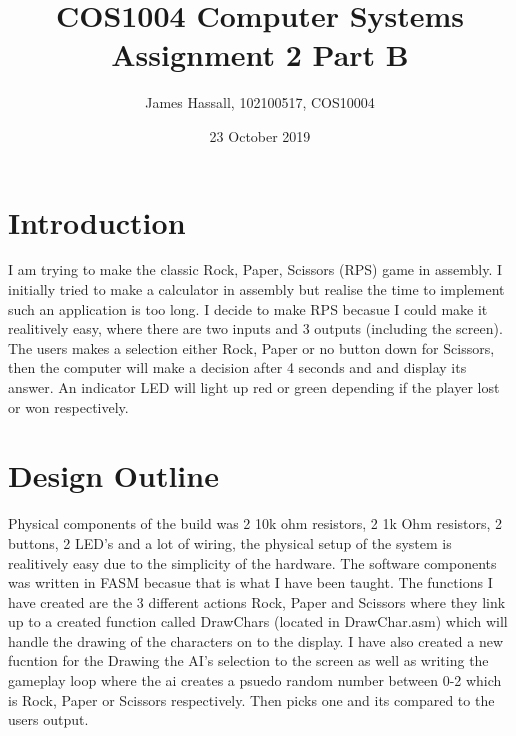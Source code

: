\documentclass{article}
\title{COS1004 Computer Systems Assignment 2 Part B}
\author{James Hassall, 102100517, COS10004}
\date{23 October 2019}
\begin{document}
\maketitle

\pagebreak
\section*{Introduction}
I am trying to make the classic Rock, Paper, Scissors (RPS) game in assembly. I initially tried to make
a calculator in assembly but realise the time to implement such an application is too long. I 
decide to make RPS becasue I could make it realitively easy, where there are two inputs and 3 outputs
(including the screen). The users makes a selection either Rock, Paper or no button down for Scissors, 
then the computer will make a decision after 4 seconds and and display its answer.  An indicator LED 
will light up red or green depending if the player lost or won respectively.

\section*{Design Outline}
Physical components of the build was 2 10k ohm resistors, 2 1k Ohm resistors, 2 buttons,
2 LED's and a lot of wiring, the physical setup of the system is realitively easy due to the simplicity
of the hardware. The software components was written in FASM becasue that is what I have been taught.
The functions I have created are the 3 different actions Rock, Paper and Scissors where they link up to
a created function called DrawChars (located in DrawChar.asm) which will handle the drawing of the characters
on to the display. I have also created a new fucntion for the Drawing the AI's selection to the screen 
as well as writing the gameplay loop where the ai creates a psuedo random number between 0-2 which is Rock, Paper
or Scissors respectively. Then picks one and its compared to the users output.
\end{document}
